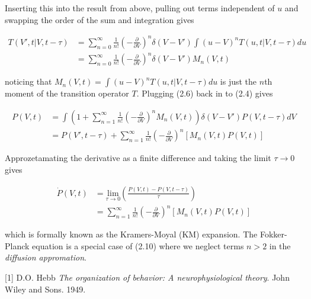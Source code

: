 \documentclass{ucetd}
\begin{document}
\begin{appendices}
Inserting this into the result from above, pulling out terms independent of $u$ and swapping the order of the sum and integration gives

\begin{align}
T(V', t | V, t-\tau) &= \sum_{n=0}^{\infty} \frac{1}{n!}\left(-\frac{\partial}{\partial V}\right)^{n}\delta(V-V')\int(u-V)^{n}T(u, t | V, t-\tau)du\\
&= \sum_{n=0}^{\infty} \frac{1}{n!}\left(-\frac{\partial}{\partial V}\right)^{n}\delta(V-V')M_{n}(V,t)
\end{align} 

noticing that $M_{n}(V,t) = \int(u-V)^{n}T(u, t | V, t-\tau)du$ is just the $n$th moment of the transition operator $T$. Plugging (2.6) back in to (2.4) gives 

\begin{align}
P(V, t) &= \int \left(1 + \sum_{n=1}^{\infty} \frac{1}{n!}\left(-\frac{\partial}{\partial V}\right)^{n} M_{n}(V,t)\right)\delta(V-V')P(V, t-\tau)dV\\
&= P(V', t-\tau) + \sum_{n=1}^{\infty} \frac{1}{n!}\left(-\frac{\partial}{\partial V}\right)^{n} \left[M_{n}(V,t)P(V,t)\right]
\end{align} 

Approzetamating the derivative as a finite difference and taking the limit $\tau\rightarrow 0$ gives

\begin{align}
\dot{P}(V,t)  &= \underset{\tau\rightarrow 0}{\mathrm{lim}}\left(\frac{P(V, t)-P(V, t-\tau)}{\tau}\right)\\
&= \sum_{n=1}^{\infty} \frac{1}{n!}\left(-\frac{\partial}{\partial V}\right)^{n} \left[M_{n}(V,t)P(V,t)\right]
\end{align} 

which is formally known as the Kramers-Moyal (KM) expansion. The Fokker-Planck equation is a special case of (2.10) where we neglect terms $n>2$ in the \emph{diffusion appromation}.
\end{appendices}

\makebibliography

[1] D.O. Hebb \textit{The organization of behavior: A neurophysiological theory}. John Wiley and Sons. 1949.

%
%
\end{document}
